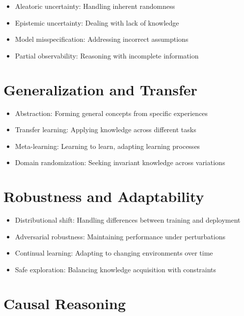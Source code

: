 \begin{itemize}
    \item Aleatoric uncertainty: Handling inherent randomness
    \item Epistemic uncertainty: Dealing with lack of knowledge
    \item Model misspecification: Addressing incorrect assumptions
    \item Partial observability: Reasoning with incomplete information
\end{itemize}

\section{Generalization and Transfer}

\begin{itemize}
    \item Abstraction: Forming general concepts from specific experiences
    \item Transfer learning: Applying knowledge across different tasks
    \item Meta-learning: Learning to learn, adapting learning processes
    \item Domain randomization: Seeking invariant knowledge across variations
\end{itemize}

\section{Robustness and Adaptability}

\begin{itemize}
    \item Distributional shift: Handling differences between training and deployment
    \item Adversarial robustness: Maintaining performance under perturbations
    \item Continual learning: Adapting to changing environments over time
    \item Safe exploration: Balancing knowledge acquisition with constraints
\end{itemize}

\section{Causal Reasoning}

